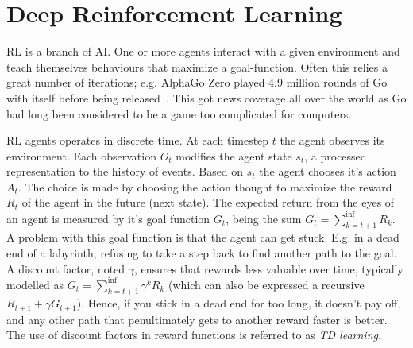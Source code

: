 \documentclass[10pt,twocolumn,letterpaper]{article}
\begin{document}
\section{Deep Reinforcement Learning}\label{sec:drl}

\gls{RL} is a branch of AI. One or more agents interact with a given environment and teach themselves 
behaviours that maximize a goal-function. Often this relies a great number of iterations; e.g. AlphaGo Zero played 4.9 million rounds of Go with itself before being released~\cite{goWithoutHumans}. This got news coverage all over the world as Go had long been considered to be a game too complicated for computers.

\gls{RL} agents operates in discrete time. At each timestep $t$ the agent observes its environment. Each observation $O_{t}$ modifies the agent state $s_{t}$, a processed representation to the history of events. Based on $s_{t}$ the agent chooses it's action $A_{t}$. The choice is made by choosing the action thought to maximize the reward $R_{t}$ of the agent in the future (next state). The expected return from the eyes of an agent is measured by it's goal function $G_{t}$, being the sum $G_{t} = \sum_{k=t+1}^{\inf{}}{R_{k}}$.
A problem with this goal function is that the agent can get stuck. E.g. in a dead end of a labyrinth; refusing to take a step back to find another path to the goal. A discount factor, noted $\gamma{}$, ensures that rewards less valuable over time, typically modelled as $G_{t} = \sum_{k=t+1}^{\inf{}}\gamma^{k}{R_{k}}$ (which can also be expressed a recursive $R_{t+1} + \gamma{G_{t+1}}$). Hence, if you stick in a dead end for too long, it doesn't pay off, and any other path that penultimately gets to another reward faster is better. The use of discount factors in reward functions is referred to as \textit{\gls{TD} learning}.
\end{document}
